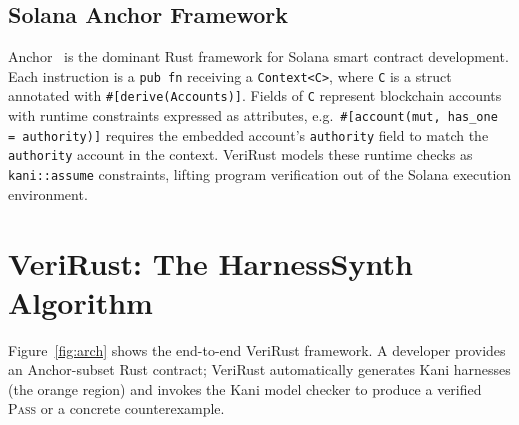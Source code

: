 \documentclass[sigconf,review,anonymous]{acmart}
\begin{document}
\subsection{Solana Anchor Framework}

Anchor~\cite{anchor} is the dominant Rust framework for Solana
smart contract development.
Each instruction is a \texttt{pub fn} receiving a
\texttt{Context<C>}, where \texttt{C} is a struct annotated with
\texttt{\#[derive(Accounts)]}.
Fields of \texttt{C} represent blockchain accounts with runtime
constraints expressed as attributes, e.g.\
\texttt{\#[account(mut, has\_one\,=\,authority)]} requires the
embedded account's \texttt{authority} field to match the
\texttt{authority} account in the context.
VeriRust models these runtime checks as \texttt{kani::assume}
constraints, lifting program verification out of the Solana
execution environment.

\section{VeriRust: The HarnessSynth Algorithm}
\label{sec:approach}

Figure~\ref{fig:arch} shows the end-to-end VeriRust framework.
A developer provides an Anchor-subset Rust contract; VeriRust
automatically generates Kani harnesses (the orange region) and
invokes the Kani model checker to produce a verified \textsc{Pass}
or a concrete counterexample.
\end{document}
